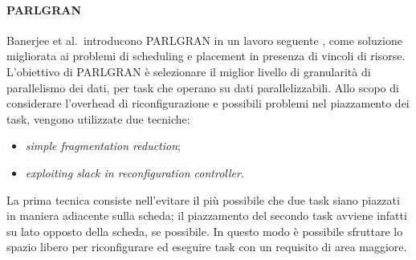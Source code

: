 \paragraph{PARLGRAN}
Banerjee et al.~introducono PARLGRAN in un lavoro seguente 
\cite{BanerjeePARLGRAN}, come soluzione migliorata ai problemi di 
scheduling e placement in presenza di vincoli di risorse. L'obiettivo di 
PARLGRAN è selezionare il miglior livello di granularità di parallelismo dei 
dati, per task che operano su dati parallelizzabili. Allo scopo di considerare 
l'overhead di riconfigurazione e possibili problemi nel piazzamento dei task, 
vengono utilizzate due tecniche:
\begin{itemize}
 \item \emph{simple fragmentation reduction};
 \item \emph{exploiting slack in reconfiguration controller}.
\end{itemize}
La prima tecnica consiste nell'evitare il più possibile che due task siano 
piazzati in maniera adiacente sulla scheda; il piazzamento del secondo task 
avviene infatti su lato opposto della scheda, se possibile. In questo modo è 
possibile sfruttare lo spazio libero per riconfigurare ed eseguire task con un 
requisito di area maggiore.

